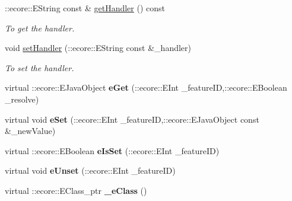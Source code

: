 \begin{DoxyCompactItemize}
::ecore::EString const \& \hyperlink{classIMS__Data_1_1Threshold_a7e1033fd42dd3b4e806522415014de56}{getHandler} () const 
\begin{DoxyCompactList}\small\item\em To get the handler. \item\end{DoxyCompactList}\item 
void \hyperlink{classIMS__Data_1_1Threshold_abde857f6eb95d0559d78ba2a40a2a48c}{setHandler} (::ecore::EString const \&\_\-handler)
\begin{DoxyCompactList}\small\item\em To set the handler. \item\end{DoxyCompactList}\item 
\hypertarget{classIMS__Data_1_1Threshold_a3b223a2298bbaf0e84c2be90a4c2fac2}{
virtual ::ecore::EJavaObject {\bfseries eGet} (::ecore::EInt \_\-featureID,::ecore::EBoolean \_\-resolve)}
\label{classIMS__Data_1_1Threshold_a3b223a2298bbaf0e84c2be90a4c2fac2}

\item 
\hypertarget{classIMS__Data_1_1Threshold_a93369854f0b645a5cf60bd4bf793fcea}{
virtual void {\bfseries eSet} (::ecore::EInt \_\-featureID,::ecore::EJavaObject const \&\_\-newValue)}
\label{classIMS__Data_1_1Threshold_a93369854f0b645a5cf60bd4bf793fcea}

\item 
\hypertarget{classIMS__Data_1_1Threshold_a7f20b3b1081235f97949f068f1b95125}{
virtual ::ecore::EBoolean {\bfseries eIsSet} (::ecore::EInt \_\-featureID)}
\label{classIMS__Data_1_1Threshold_a7f20b3b1081235f97949f068f1b95125}

\item 
\hypertarget{classIMS__Data_1_1Threshold_a074d037b43bc6bffdc44de542cdb994e}{
virtual void {\bfseries eUnset} (::ecore::EInt \_\-featureID)}
\label{classIMS__Data_1_1Threshold_a074d037b43bc6bffdc44de542cdb994e}

\item 
\hypertarget{classIMS__Data_1_1Threshold_a004689426e4ed1673f9f1cdefd5b25ae}{
virtual ::ecore::EClass\_\-ptr {\bfseries \_\-eClass} ()}
\label{classIMS__Data_1_1Threshold_a004689426e4ed1673f9f1cdefd5b25ae}

\end{DoxyCompactItemize}
